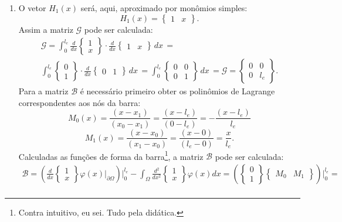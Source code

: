 \begin{tcolorbox}[breakable, colback=white, colframe=black, boxrule=0.4pt, arc=0pt, outer arc=0pt]
        \begin{enumerate}[label=\alph*), leftmargin=*]
            \item O vetor $H_1(x)$ será, aqui, aproximado por monômios simples: $$H_1(x) = \begin{Bmatrix} 1 & x \end{Bmatrix}.$$ Assim a matriz $\mathcal{G}$ pode ser calculada:
            $$\begin{aligned}
                \mathcal{G} = \int_{0}^{l_e} \frac{d}{dx} \begin{Bmatrix} 1 \\ x \end{Bmatrix}  \cdot \frac{d}{dx} \begin{Bmatrix} 1 & x \end{Bmatrix} \, dx \, = \\
                \int_{0}^{l_e} \begin{Bmatrix} 0 \\ 1 \end{Bmatrix}  \cdot \frac{d}{dx} \begin{Bmatrix} 0 & 1 \end{Bmatrix} \, dx \, = \int_{0}^{l_e} \begin{Bmatrix} 0 & 0 \\ 0 & 1 \end{Bmatrix} \, dx \, = \mathcal{G} = \begin{Bmatrix} 0 & 0 \\ 0 & l_e \end{Bmatrix}.
            \end{aligned}$$
            Para a matriz $\mathcal{B}$ é necessário primeiro obter os polinômios de Lagrange correspondentes aos nós da barra: $$M_0(x) = \frac{(x - x_1)}{(x_0 - x_1)} = \frac{(x - l_e)}{(0 - l_e)} = - \frac{(x - l_e)}{l_e}$$ $$M_1(x) = \frac{(x - x_0)}{(x_1 - x_0)} = \frac{(x - 0)}{(l_e - 0)} = \frac{x}{l_e}.$$ Calculadas as funções de forma da barra\footnote{Contra intuitivo, eu sei. Tudo pela didática.}, a matriz $\mathcal{B}$ pode ser calculada:
            $$\begin{aligned}
                \mathcal{B} = \left(\frac{d}{dx} \begin{Bmatrix} 1 \\ x \end{Bmatrix}\varphi(x)\Big|_{\partial \Omega}\right)\Big|_{0}^{l_e} - \int_{\Omega} \frac{d^2}{dx^2}\begin{Bmatrix} 1 \\ x \end{Bmatrix} \varphi(x) dx = \left( \begin{Bmatrix} 0 \\ 1 \end{Bmatrix}\begin{Bmatrix} M_0 & M_1 \end{Bmatrix}\right)\Big|_{0}^{l_e} = \\

\end{aligned}$$
\end{enumerate}
\end{tcolorbox}
